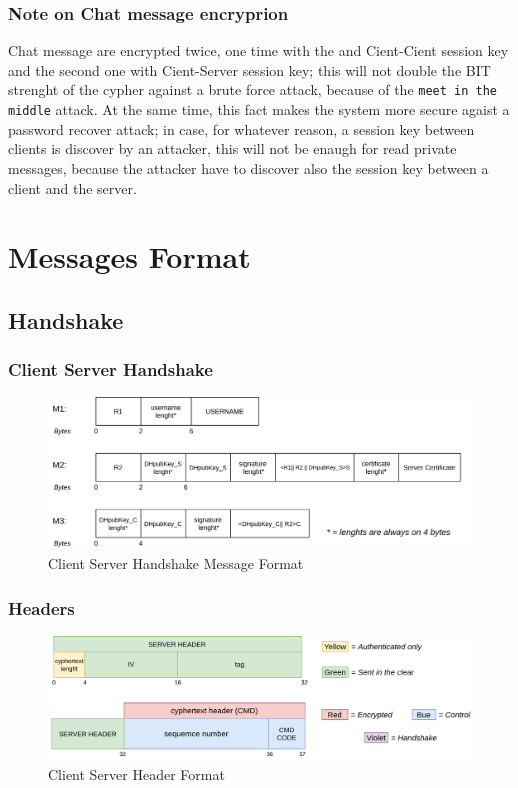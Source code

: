 \documentclass[11pt]{report}
\begin{document}
\subsection*{Note on Chat message encryprion }
Chat message are encrypted twice, one time with the and Cient-Cient session key and 
the second one with Cient-Server session key; this will not double the BIT strenght of the cypher against 
a brute force attack, because of the \texttt{meet in the middle} attack. 
At the same time, this fact makes the system more secure agaist a password recover attack; in case, for
whatever reason, a session key between clients is discover by an attacker, this will not be enaugh for read private messages,
because the attacker have to discover also the session key between a client and the server.

\chapter{Messages Format}

\section{Handshake}
\subsection*{Client Server Handshake}
\begin{figure}[H]
	\centering
	\includegraphics[scale=0.28]{img/AuthClientServer_messageFormat.png}
	\caption{Client Server Handshake Message Format}
	\label {img: FormatClientServer}
\end{figure}
\subsection*{Headers}
\begin{figure}[H]
	\centering
	\includegraphics[scale=0.24]{img/HeaderFormat.png}
	\caption{Client Server Header Format}
	\label {img: FormatClientServerHeader}
\end{figure}
\end{document}
